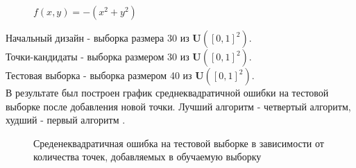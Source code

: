 \documentclass{article}
\begin{document}
\begin{figure}[h]
\caption{$f(x,y) = -(x^2 + y^2)$}
\label{ris:image}
\end{figure}

Начальный дизайн - выборка размера 30 из $\mathbf{U}([0,1]^2)$.\\
Точки-кандидаты - выборка размером 30 из $\mathbf{U}([0,1]^2)$.\\
Тестовая выборка - выборка размером 40 из $\mathbf{U}([0,1]^2)$.\\
В результате был построен график среднеквадратичной ошибки на тестовой выборке после добавления
новой точки. Лучший алгоритм - четвертый алгоритм, худший - первый алгоритм .\\
\begin{figure}[h]
\caption{Среденеквадратичная ошибка на тестовой выборке в зависимости от количества точек, добавляемых в обучаемую выборку}
\label{ris:image}
\end{figure}
\end{document}
